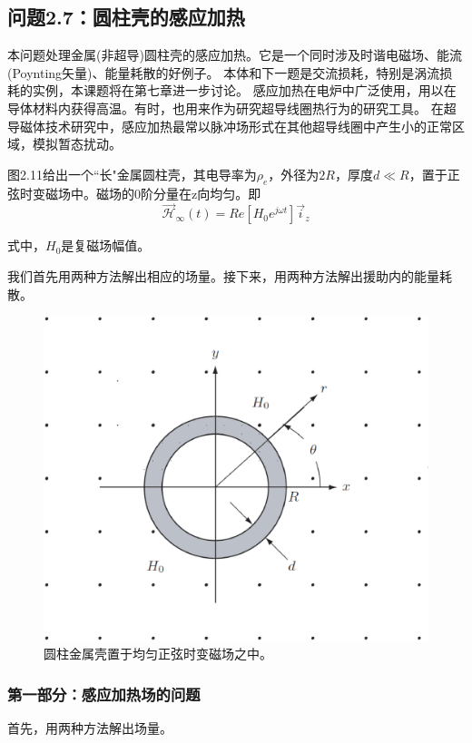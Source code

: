 \subsection{问题2.7：圆柱壳的感应加热}
本问题处理金属(非超导)圆柱壳的感应加热。它是一个同时涉及时谐电磁场、能流(Poynting矢量)、能量耗散的好例子。
本体和下一题是交流损耗，特别是涡流损耗的实例，本课题将在第七章进一步讨论。
感应加热在电炉中广泛使用，用以在导体材料内获得高温。有时，也用来作为研究超导线圈热行为的研究工具。
在超导磁体技术研究中，感应加热最常以脉冲场形式在其他超导线圈中产生小的正常区域，模拟暂态扰动。

图2.11给出一个``长"金属圆柱壳，其电导率为$\rho_e$，外径为$2R$，厚度$d\ll R$，置于正弦时变磁场中。磁场的0阶分量在z向均匀。即
\begin{equation*}
\vec{\mathcal{H}}_\infty(t)=Re[H_0 e^{j\omega t}] \vec{i}_z \tag{2.54}
\end{equation*}

式中，$H_0$是复磁场幅值。

我们首先用两种方法解出相应的场量。接下来，用两种方法解出援助内的能量耗散。

\begin{figure}[htbp]
  \centering
 \includegraphics[scale=0.4]{chpt2/figs/fig2.11.eps}
  \caption{圆柱金属壳置于均匀正弦时变磁场之中。}
\end{figure}

\subsubsection*{第一部分：感应加热场的问题}
首先，用两种方法解出场量。

